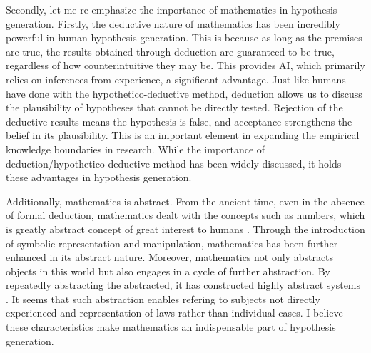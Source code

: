 Secondly, let me re-emphasize the importance of mathematics in hypothesis generation. Firstly, the deductive nature of mathematics has been incredibly powerful in human hypothesis generation. This is because as long as the premises are true, the results obtained through deduction are guaranteed to be true, regardless of how counterintuitive they may be. This provides AI, which primarily relies on inferences from experience, a significant advantage. Just like humans have done with the hypothetico-deductive method, deduction allows us to discuss the plausibility of hypotheses that cannot be directly tested. Rejection of the deductive results means the hypothesis is false, and acceptance strengthens the belief in its plausibility. This is an important element in expanding the empirical knowledge boundaries in research. While the importance of deduction/hypothetico-deductive method has been widely discussed, it holds these advantages in hypothesis generation.

Additionally, mathematics is abstract. From the ancient time, even in the absence of formal deduction, mathematics dealt with the concepts such as numbers, which is greatly abstract concept of great interest to humans \cite{david2010history}. Through the introduction of symbolic representation and manipulation, mathematics has been further enhanced in its abstract nature. Moreover, mathematics not only abstracts objects in this world but also engages in a cycle of further abstraction. By repeatedly abstracting the abstracted, it has constructed highly abstract systems \cite{bochner1968role}. It seems that such abstraction enables refering to subjects not directly experienced \cite{heisenberg2008abstraction} and representation of laws rather than individual cases. I believe these characteristics make mathematics an indispensable part of hypothesis generation.



